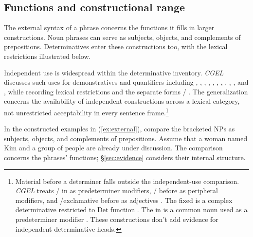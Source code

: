 \documentclass[12pt]{article}
\begin{document}
\subsection{Functions and constructional range}\label{sec:independent}

The external syntax of a phrase concerns the functions it fills in larger constructions. Noun phrases can serve as subjects, objects, and complements of prepositions. Determinatives enter these constructions too, with the lexical restrictions illustrated below.

Independent use is widespread within the determinative inventory. \textit{CGEL} discusses such uses for demonstratives and quantifiers including , , , , , , , , , , and , while recording lexical restrictions and the separate forms / \citep[371--372, 410--424]{huddleston2002}. The generalization concerns the availability of independent constructions across a lexical category, not unrestricted acceptability in every sentence frame.\footnote{Material before a determiner falls outside the independent-use comparison. \textit{CGEL} treats / in  as predeterminer modifiers, / before  as peripheral modifiers, and /exclamative  before  as adjectives \citep[433--437]{huddleston2002}. The fixed  is a complex determinative restricted to Det function \citep[394]{huddleston2002}. The  in  is a common noun used as a predeterminer modifier \citep[434]{huddleston2002}. These constructions don't add evidence for independent determinative heads.}

In the constructed examples in (\ref{ex:external}), compare the bracketed NPs as subjects, objects, and complements of prepositions. Assume that a woman named Kim and a group of people are already under discussion. The comparison concerns the phrases' functions; §\ref{sec:evidence} considers their internal structure.

\begin{samepage}

\ea\label{ex:external}
\ea {}\qquad {}\qquad {}
\ex {}\qquad {}\qquad {}
\ex {}\qquad {}\qquad {}
\ex {}\qquad {}\qquad {}
\z\z

\end{samepage}
\end{document}
